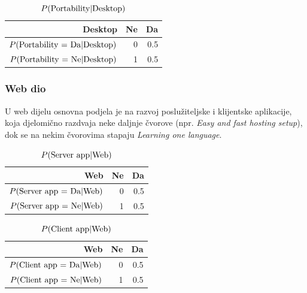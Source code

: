 \documentclass{article}
\begin{document}
	\begin{table}[h]
		\centering
		\begin{tabular}{ r || r | r }
			Desktop	& Ne & Da \\ \hline
			$ P(\textnormal{Portability = Da} | \textnormal{Desktop}) $ & 0 & 0.5 \\
			$ P(\textnormal{Portability = Ne} | \textnormal{Desktop}) $ & 1 & 0.5 \\
			
		\end{tabular}
		\caption{$ P(\textnormal{Portability} | \textnormal{Desktop}) $}
		\label{fig:portability_p}
	\end{table}
	
	\subsubsection{Web dio}
	U web dijelu osnovna podjela je na razvoj poslužiteljske i klijentske aplikacije, koja djelomično razdvaja neke daljnje čvorove (npr. \textit{Easy and fast hosting setup}), dok se na nekim čvorovima stapaju \textit{Learning one language}.
	
	\begin{table}[h]
		\centering
		\begin{tabular}{ r || r | r }
			Web	& Ne & Da \\ \hline
			$ P(\textnormal{Server app = Da} | \textnormal{Web}) $ & 0 & 0.5 \\
			$ P(\textnormal{Server app = Ne} | \textnormal{Web}) $ & 1 & 0.5 \\
			
		\end{tabular}
		\caption{$ P(\textnormal{Server app} | \textnormal{Web}) $}
		\label{fig:server_app_p}
	\end{table}
	
	\begin{table}[h]
		\centering
		\begin{tabular}{ r || r | r }
			Web	& Ne & Da \\ \hline
			$ P(\textnormal{Client app = Da} | \textnormal{Web}) $ & 0 & 0.5 \\
			$ P(\textnormal{Client app = Ne} | \textnormal{Web}) $ & 1 & 0.5 \\
			
		\end{tabular}
		\caption{$ P(\textnormal{Client app} | \textnormal{Web}) $}
		\label{fig:client_app_p}
	\end{table}
	
\end{document}
